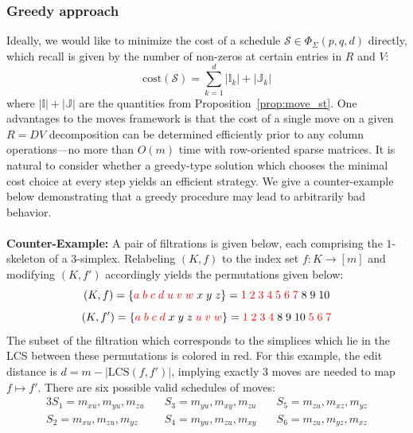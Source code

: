 \documentclass[sn-mathphys]{sn-jnl}
\begin{document}
\subsubsection{Greedy approach}\label{sec:greedy} 
Ideally, we would like to minimize the cost of a schedule $\mathcal{S} \in \Phi_\Sigma(p,q,d)$ directly, which recall is given by the number of non-zeros at certain entries in $R$ and $V$: 
\begin{equation}\label{eq:schedule_cost}
\mathrm{cost}(\mathcal{S}) = \sum\limits_{k=1}^d \lvert \mathbb{I}_k \rvert + \lvert \mathbb{J}_k\rvert
\end{equation}
where $\lvert \mathbb{I}\rvert + \lvert \mathbb{J}\rvert$ are the quantities from Proposition~\ref{prop:move_st}. One advantages to the moves framework is that the cost of a single move on a given $R = D V$ decomposition can be determined efficiently prior to any column operations---no more than $O(m)$ time with row-oriented sparse matrices. 
It is natural to consider whether a greedy-type solution which chooses the minimal cost choice at every step yields an efficient strategy. We give a counter-example below demonstrating that a greedy procedure may lead to arbitrarily bad behavior. 
\\
\\
\textbf{Counter-Example:} A pair of filtrations is given below, each comprising the $1$-skeleton of a $3$-simplex. Relabeling $(K, f)$ to the index set $f : K \to [m]$ and modifying $(K, f')$ accordingly yields the permutations given below: 
$$ (K, f) = \{ {\color{red} a \; b \; c \; d \; u \; v \; w} \; x \; y \; z  \} = { {\color{red} 1 \; 2 \; 3 \; 4 \; 5 \; 6 \; 7 } \; 8 \; 9 \; 10 } $$
$$ (K, f') = \{ {\color{red} a \; b \; c \; d } \; x \; y \; z \; {\color{red} u \; v \; w } \}  = { {\color{red} 1 \; 2 \; 3 \; 4 } \;8 \; 9 \; 10 \; {\color{red} 5 \; 6 \; 7 } }$$
The subset of the filtration which corresponds to the simplices which lie in the LCS between these permutations is colored in red. For this example, the edit distance is 
$d = m - \lvert \mathrm{LCS}(f, f') \rvert$, implying exactly $3$ moves are needed to map $f \mapsto f'$. There are six possible valid schedules of moves: 
\begin{alignat*}{3}
	S_1 = m_{x u}, m_{y u}, m_{z u} \quad & S_3 = m_{y u}, m_{x y}, m_{z u} \quad  & S_5 = m_{z u}, m_{x z}, m_{y z} \\
	S_2 = m_{x u}, m_{z u}, m_{y z} \quad  & S_4 = m_{y u}, m_{z u}, m_{x y} \quad  & S_6 = m_{z u}, m_{y z}, m_{x z} 
\end{alignat*}
\end{document}
